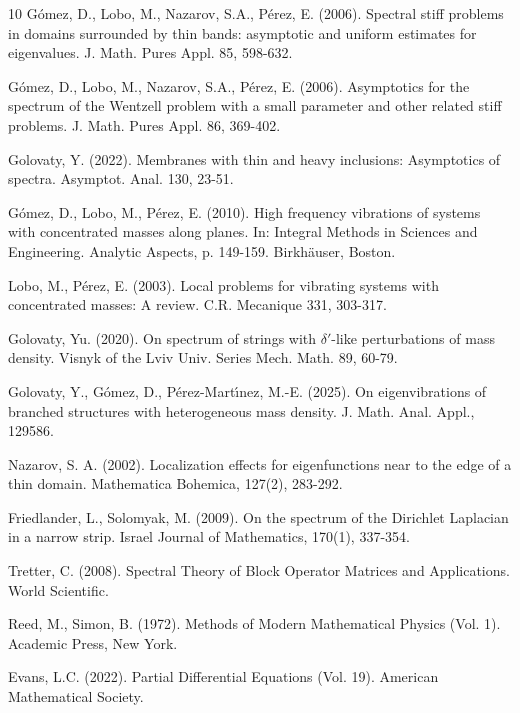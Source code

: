 \documentclass[reqno]{amsart}
\theoremstyle{definition}
\theoremstyle{remark}
\numberwithin{equation}{section}
\begin{document}
\begin{thebibliography}{10}
    G\'omez, D., Lobo, M., Nazarov, S.A., P\'erez, E. (2006). Spectral stiff problems in domains surrounded by thin bands: asymptotic and uniform estimates for eigenvalues. J. Math. Pures Appl. 85, 598-632.


    G\'omez, D., Lobo, M., Nazarov, S.A., P\'erez, E. (2006). Asymptotics for the spectrum of the Wentzell problem with a small parameter and other related stiff problems. J. Math. Pures Appl. 86, 369-402.


    Golovaty, Y. (2022).     Membranes with thin and heavy inclusions: Asymptotics of spectra.
    Asymptot. Anal. 130, 23-51.


 
  
    G\'omez, D., Lobo, M., P\'erez, E. (2010). High frequency vibrations of systems with concentrated masses along planes. In: Integral Methods in Sciences and Engineering. Analytic Aspects, p. 149-159. Birkh\"auser, Boston.

    Lobo, M., P\'erez, E. (2003). Local problems for vibrating systems with concentrated masses: A review. C.R. Mecanique 331, 303-317.



    Golovaty, Yu. (2020). On spectrum of strings with $\delta'$-like perturbations of mass density.
    Visnyk of the Lviv Univ. Series Mech. Math. 89, 60-79.

  
    Golovaty, Y., G\'omez, D.,  P\'erez-Mart\'{\i}nez, M.-E. (2025). On eigenvibrations of branched structures with heterogeneous mass density. J. Math. Anal. Appl., 129586.
    
    Nazarov, S. A. (2002). Localization effects for eigenfunctions near to the edge of a thin domain. Mathematica Bohemica, 127(2), 283-292.
   
    Friedlander, L., Solomyak, M. (2009). On the spectrum of the Dirichlet Laplacian in a narrow strip. Israel Journal of Mathematics, 170(1), 337-354.  

    Tretter, C. (2008). Spectral Theory of Block Operator Matrices and Applications. World Scientific.
    
    Reed, M.,  Simon, B. (1972). Methods of Modern Mathematical Physics (Vol. 1). Academic Press, New York.

    Evans, L.C. (2022). Partial Differential Equations (Vol. 19). American Mathematical Society.



\end{thebibliography}
\end{document}
